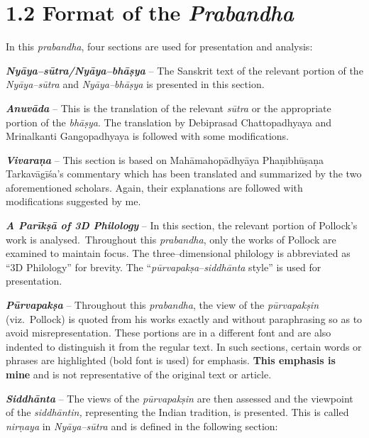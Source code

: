 \vspace{-.3cm}

\section*{1.2 Format of the {\it {\bfseries Prabandha}}}

\vspace{-.2cm}

In this \textit{prabandha}, four sections are used for presentation and analysis:

\textit{\textbf{Nyāya–sūtra/Nyāya–bhāṣya}} – The Sanskrit text of the relevant portion of the \textit{Nyāya–sūtra }and \textit{Nyāya–bhāṣya} is presented in this section.

\textit{\textbf{Anuvāda}} – This is the translation of the relevant \textit{sūtra} or the appropriate portion of the \textit{bhāṣya}. The translation by Debiprasad Chattopadhyaya and Mrinalkanti Gangopadhyaya is followed with some modifications.

\textit{\textbf{Vivaraṇa}} – This section is based on Mahāmahopādhyāya Phaṇibhūṣaṇa Tarkavāgīśa’s commentary which has been translated and summarized by the two aforementioned scholars. Again, their explanations are followed with modifications suggested by me.

\textbf{\textit{A Parīkṣā of 3D Philology}} – In this section, the relevant portion of Pollock’s work is analysed.~Throughout this \textit{prabandha}, only the works of Pollock are examined to maintain focus. The three–dimensional philology is abbreviated as “3D Philology” for brevity. The “\textit{pūrvapakṣa}–\textit{siddhānta} style” is used for presentation.

\textit{\textbf{Pūrvapakṣa}} – Throughout this \textit{prabandha}, the view of the \textit{pūrvapakṣin} (viz.~Pollock) is quoted from his works exactly and without paraphrasing so as to avoid misrepresentation. These portions are in a different font and are also indented to distinguish it from the regular text. In such sections, certain words or phrases are highlighted (bold font is used) for emphasis. \textbf{This emphasis is mine} and is not representative of the original text or article.

\textit{\textbf{Siddhānta}} – The views of the \textit{pūrvapakṣin} are then assessed and the viewpoint of the \textit{siddhāntin,} representing the Indian tradition, is presented. This is called \textit{nirṇaya} in \textit{Nyāya–sūtra} and is defined in the following section:


